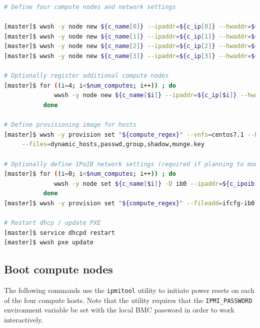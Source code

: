 \documentclass[letterpaper]{article}
\begin{document}
\begin{lstlisting}[language=bash,keywords={},upquote=true,basicstyle=\footnotesize\ttfamily]
# Define four compute nodes and network settings 

[master]$ wwsh -y node new ${c_name[0]} --ipaddr=${c_ip[0]} --hwaddr=${c_mac[0]} -D ${eth_provision}
[master]$ wwsh -y node new ${c_name[1]} --ipaddr=${c_ip[1]} --hwaddr=${c_mac[1]} -D ${eth_provision}
[master]$ wwsh -y node new ${c_name[2]} --ipaddr=${c_ip[2]} --hwaddr=${c_mac[2]} -D ${eth_provision}
[master]$ wwsh -y node new ${c_name[3]} --ipaddr=${c_ip[3]} --hwaddr=${c_mac[3]} -D ${eth_provision}

# Optionally register additional compute nodes
[master]$ for ((i=4; i<$num_computes; i++)) ; do
              wwsh -y node new ${c_name[$i]} --ipaddr=${c_ip[$i]} --hwaddr=${c_mac[$i]} -D ${eth_provision}
           done

# Define provisioning image for hosts
[master]$ wwsh -y provision set "${compute_regex}" --vnfs=centos7.1 --bootstrap=`uname -r` \
     --files=dynamic_hosts,passwd,group,shadow,munge.key 

# Optionally define IPoIB network settings (required if planning to mount Lustre over IB)
[master]$ for ((i=0; i<$num_computes; i++)) ; do
              wwsh -y node set ${c_name[$i]} -D ib0 --ipaddr=${c_ipoib[$i]} --netmask=${ipoib_netmask}
           done
[master]$ wwsh -y provision set "${compute_regex}" --fileadd=ifcfg-ib0.ww

# Restart dhcp / update PXE
[master]$ service dhcpd restart
[master]$ wwsh pxe update
\end{lstlisting}




\subsection{Boot compute nodes} \label{sec:boot_computes}

 
The following commands use the \texttt{ipmitool} utility to initiate power
resets on each of the four compute hosts. Note that the utility requires that
the \texttt{IPMI\_PASSWORD} environment variable be set with the local BMC password in
order to work interactively.
\end{document}
